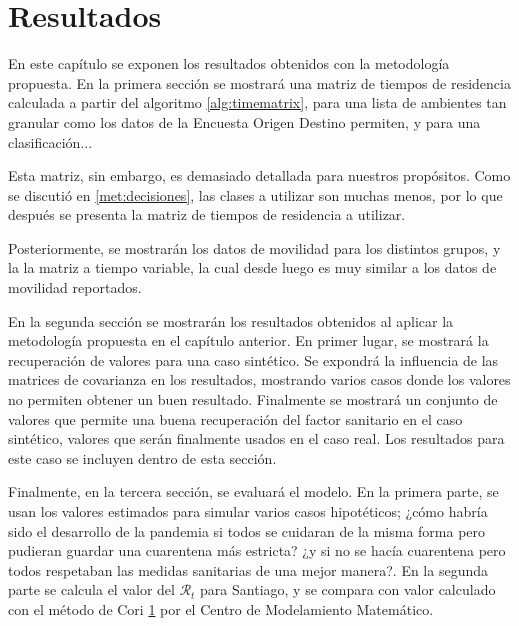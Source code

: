 \chapter{Resultados}


En este capítulo se exponen los resultados obtenidos con la metodología propuesta. En la primera sección se mostrará una matriz de tiempos de residencia calculada a partir del algoritmo \ref{alg:timematrix}, para una lista de ambientes tan granular como los datos de la Encuesta Origen Destino permiten, y para una clasificación...

Esta matriz, sin embargo, es demasiado detallada para nuestros propósitos. Como se discutió en \ref{met:decisiones}, las clases a utilizar son muchas menos, por lo que después se presenta la matriz de tiempos de residencia a utilizar. 

Posteriormente, se mostrarán los datos de movilidad para los distintos grupos, y la la matriz a tiempo variable, la cual desde luego es muy similar a los datos de movilidad reportados. 

En la segunda sección se mostrarán los resultados obtenidos al aplicar la metodología propuesta en el capítulo anterior. En primer lugar, se mostrará la recuperación de valores para una caso sintético. Se expondrá la influencia de las matrices de covarianza en los resultados, mostrando varios casos donde los valores no permiten obtener un buen resultado. Finalmente se mostrará un conjunto de valores que permite una buena recuperación del factor sanitario en el caso sintético, valores que serán finalmente usados en el caso real. Los resultados para este caso se incluyen dentro de esta sección. 

Finalmente, en la tercera sección, se evaluará el modelo. En la primera parte, se usan los valores estimados para simular varios casos hipotéticos; ¿cómo habría sido el desarrollo de la pandemia si todos se cuidaran de la misma forma pero pudieran guardar una cuarentena más estricta? ¿y si no se hacía cuarentena pero todos respetaban las medidas sanitarias de una mejor manera?. En la segunda parte se calcula el valor del \(\mathcal{R}_t\) para Santiago, y se compara con valor calculado con el método de Cori \ref{} por el Centro de Modelamiento Matemático. 











